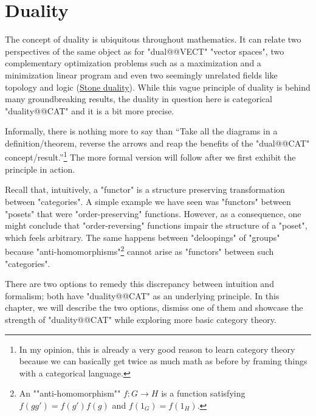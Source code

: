 \documentclass[main.tex]{subfiles}
\begin{document}
\chapter{Duality}\label{chap:duality}
The concept of duality is ubiquitous throughout mathematics. It can relate two perspectives of the same object as for "dual@@VECT" "vector spaces", two complementary optimization problems such as a maximization and a minimization linear program and even two seemingly unrelated fields like topology and logic (\href{https://en.wikipedia.org/wiki/Stone_duality}{Stone duality}). While this vague principle of duality is behind many groundbreaking results, the duality in question here is categorical "duality@@CAT" and it is a bit more precise.%

Informally, there is nothing more to say than ``Take all the diagrams in a definition/theorem, reverse the arrows and reap the benefits of the "dual@@CAT" concept/result.''\footnote{In my opinion, this is already a very good reason to learn category theory because we can basically get twice as much math as before by framing things with a categorical language.} The more formal version will follow after we first exhibit the principle in action.

Recall that, intuitively, a "functor" is a structure preserving transformation between "categories". A simple example we have seen was "functors" between "posets" that were "order-preserving" functions. However, as a consequence, one might conclude that "order-reversing" functions impair the structure of a "poset", which feels arbitrary. The same happens between "deloopings" of "groups" because "anti-homomorphisms"\footnote{\AP An ""anti-homomorphism"" $f: G \rightarrow H$ is a function satisfying $f(gg') = f(g')f(g)$ and $f(1_G) = f(1_H)$.} cannot arise as "functors" between such "categories". %

There are two options to remedy this discrepancy between intuition and formalism; both have "duality@@CAT" as an underlying principle. In this chapter, we will describe the two options, dismiss one of them and showcase the strength of "duality@@CAT" while exploring more basic category theory.
\end{document}
